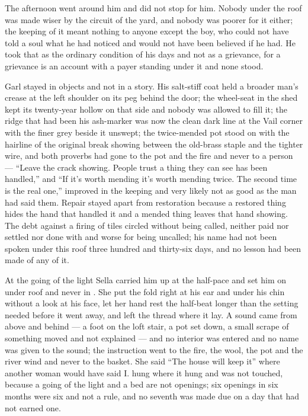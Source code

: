 The afternoon went around him and did not stop for him. Nobody under the roof was made wiser by the circuit of the yard, and nobody was poorer for it either; the keeping of it meant nothing to anyone except the boy, who could not have told a soul what he had noticed and would not have been believed if he had. He took that as the ordinary condition of his days and not as a grievance, for a grievance is an account with a payer standing under it and none stood.

\scenebreak

Garl stayed in objects and not in a story. His salt-stiff coat held a broader man's crease at the left shoulder on its peg behind the door; the wheel-seat in the shed kept its twenty-year hollow on that side and nobody was allowed to fill it; the ridge that had been his ash-marker was now the clean dark line at the Vail corner with the finer grey beside it unswept; the twice-mended pot stood on  with the hairline of the original break showing between the old-brass staple and the tighter wire, and both proverbs had gone to the pot and the fire and never to a person --- “Leave the crack showing. People trust a thing they can see has been handled,” and “If it's worth mending it's worth mending twice. The second time is the real one,” improved in the keeping and very likely not as good as the man had said them. Repair stayed apart from restoration because a restored thing hides the hand that handled it and a mended thing leaves that hand showing. The debt against a firing of tiles circled without being called, neither paid nor settled nor done with and worse for being uncalled; his name had not been spoken under this roof three hundred and thirty-six days, and no lesson had been made of any of it.

At the going of the light Sella carried him up at the half-pace and set him on  under  roof and never in . She put the fold right at his ear and under his chin without a look at his face, let her hand rest the half-beat longer than the setting needed before it went away, and left the thread where it lay. A sound came from above and behind --- a foot on the loft stair, a pot set down, a small scrape of something moved and not explained --- and no interior was entered and no name was given to the sound; the instruction went to the fire, the wool, the pot and the river wind and never to the basket. She said “The house will keep it” where another woman would have said I.  hung where it hung and was not touched, because a going of the light and a bed are not openings; six openings in six months were six and not a rule, and no seventh was made due on a day that had not earned one.

